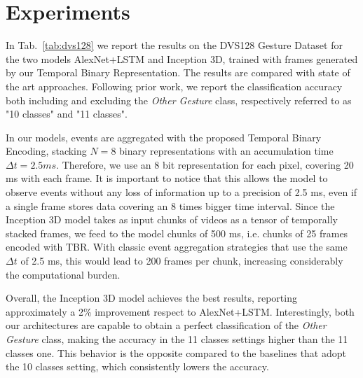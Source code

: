 \documentclass[a4paper,conference]{IEEEtran}
\begin{document}
\section{Experiments}
\label{sec:experiments}
In Tab.~\ref{tab:dvs128} we report the results on the DVS128 Gesture Dataset for the two models AlexNet+LSTM and Inception 3D, trained with frames generated by our Temporal Binary Representation. The results are compared with state of the art approaches. Following prior work, we report the classification accuracy both including and excluding the \textit{Other Gesture} class, respectively referred to as "10 classes" and "11 classes".

In our models, events are aggregated with the proposed Temporal Binary Encoding, stacking $N=8$ binary representations with an accumulation time $\Delta t=2.5 ms$. Therefore, we use an 8 bit representation for each pixel, covering 20 ms with each frame. It is important to notice that this allows the model to observe events without any loss of information up to a precision of 2.5 ms, even if a single frame stores data covering an 8 times bigger time interval.
Since the Inception 3D model takes as input chunks of videos as a tensor of temporally stacked frames, we feed to the model chunks of 500 ms, i.e. chunks of 25 frames encoded with TBR. With classic event aggregation strategies that use the same $\Delta t$ of 2.5 ms, this would lead to 200 frames per chunk, increasing considerably the computational burden.

Overall, the Inception 3D model achieves the best results, reporting approximately a 2\% improvement respect to AlexNet+LSTM. Interestingly, both our architectures are capable to obtain a perfect classification of the \textit{Other Gesture} class, making the accuracy in the 11 classes settings higher than the 11 classes one. This behavior is the opposite compared to the baselines that adopt the 10 classes setting, which consistently lowers the accuracy.
\end{document}
